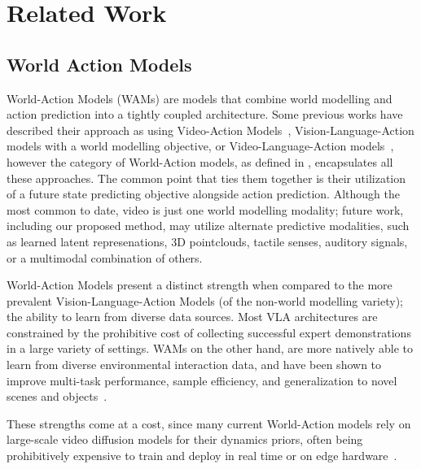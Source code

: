 \section{Related Work}

\subsection{World Action Models}
World-Action Models (WAMs) are models that combine world modelling and action prediction into a tightly coupled architecture. Some previous works have described their approach as using Video-Action Models~\cite{MimicVideo, UVAM}, Vision-Language-Action models with a world modelling objective\cite{VLAJEPA, won2025dual}, or Video-Language-Action models~\cite{GR-2}, however the category of World-Action models, as defined in \citet{DreamZero}, encapsulates all these approaches. The common point that ties them together is their utilization of a future state predicting objective alongside action prediction. Although the most common to date, video is just one world modelling modality; future work, including our proposed method, may utilize alternate predictive modalities, such as learned latent represenations, 3D pointclouds, tactile senses, auditory signals, or a multimodal combination of others.

World-Action Models present a distinct strength when compared to the more prevalent Vision-Language-Action Models (of the non-world modelling variety); the ability to learn from diverse data sources. Most VLA architectures are constrained by the prohibitive cost of collecting successful expert demonstrations in a large variety of settings. WAMs on the other hand, are more natively able to learn from diverse environmental interaction data, and have been shown to improve multi-task performance, sample efficiency, and generalization to novel scenes and objects~\cite{DreamZero, MimicVideo, UWM, TRIWAM, CosmosPolicy}.

These strengths come at a cost, since many current World-Action models rely on large-scale video diffusion models for their dynamics priors, often being prohibitively expensive to train and deploy in real time or on edge hardware~\cite{DreamZero}. 


